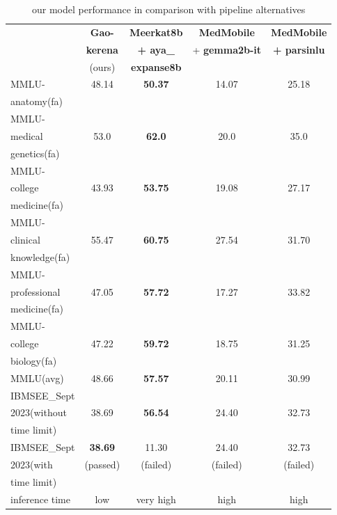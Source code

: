 \documentclass[conference]{IEEEtran}
\begin{document}
\begin{table}[ht]
	\centering
	\caption{our model performance 
		in comparison with pipeline alternatives}
	\begin{tabular}{|l|c|c|c|c|}  %
		\hline
		\textbf{} & \textbf{Gao-} & \textbf{Meerkat8b}
		& \textbf{MedMobile} & \textbf{MedMobile} \\ 
		& \textbf{kerena} & \textbf{+ aya\_} & + \textbf{gemma2b-it} & \textbf{+ parsinlu} \\
		& (ours) & \textbf{expanse8b}  &  &  \\ \hline
		MMLU- & 48.14 & \textbf{50.37} & 14.07 & 25.18 \\ 
		anatomy(fa) &  &  &  &  \\ \hline
		MMLU- &  &   &  &  \\
		medical & 53.0 & \textbf{62.0} & 20.0 & 35.0 \\ 
		genetics(fa) &  &  &  &  \\ \hline
		MMLU- &  &  &  &  \\
		college & 43.93 & \textbf{53.75} & 19.08 & 27.17 \\
		medicine(fa) &  &  &  &  \\ \hline
		MMLU- &  &  &  &  \\
		clinical& 55.47 & \textbf{60.75} & 27.54 & 31.70 \\
		knowledge(fa)&  &  &  &  \\ \hline
		MMLU- &  & &  &  \\
		professional& 47.05 & \textbf{57.72} & 17.27 & 33.82 \\ 
		medicine(fa)&  &  &  &  \\ \hline
		MMLU- &  &  &  &  \\
		college& 47.22 & \textbf{59.72} & 18.75 & 31.25 \\
		biology(fa)&  &  &  &  \\ \hline
		MMLU(avg) & 48.66 & \textbf{57.57} & 20.11 & 30.99 \\ \hline
		IBMSEE\_Sept &  &  &  &  \\ 
		2023(without & 38.69 & \textbf{56.54} & 24.40 & 32.73 \\  
		time limit) &  &  &  &  \\  \hline
		IBMSEE\_Sept & \textbf{38.69} & 11.30 & 24.40 & 32.73 \\ 
		2023(with & (passed) & (failed) & (failed) & (failed) \\  
		time limit) &  &  &  &  \\  \hline
		inference time & low & very high & high & high \\  \hline
	\end{tabular}
	\label{tab:model_results_on_mcqa_vs_pipeline_alternative}
\end{table}
\end{document}
